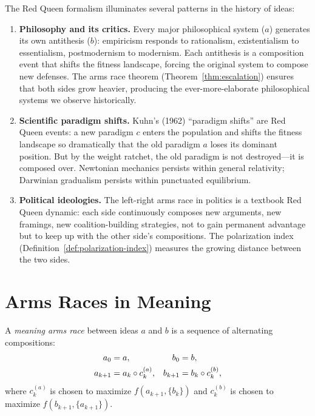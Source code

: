 \begin{interpretation}
\label{interp:coevolution-history}
The Red Queen formalism illuminates several patterns in the history of ideas:

\begin{enumerate}
  \item \textbf{Philosophy and its critics.}  Every major philosophical system
        ($a$) generates its own antithesis ($b$): empiricism responds to
        rationalism, existentialism to essentialism, postmodernism to modernism.
        Each antithesis is a composition event that shifts the fitness landscape,
        forcing the original system to compose new defenses.  The arms race
        theorem (Theorem~\ref{thm:escalation}) ensures that both sides grow
        heavier, producing the ever-more-elaborate philosophical systems we
        observe historically.

  \item \textbf{Scientific paradigm shifts.}  Kuhn's (1962) ``paradigm shifts''
        are Red Queen events: a new paradigm $c$ enters the population and
        shifts the fitness landscape so dramatically that the old paradigm $a$
        loses its dominant position.  But by the weight ratchet, the old
        paradigm is not destroyed---it is composed over.  Newtonian mechanics
        persists within general relativity; Darwinian gradualism persists
        within punctuated equilibrium.

  \item \textbf{Political ideologies.}  The left-right arms race in politics
        is a textbook Red Queen dynamic: each side continuously composes new
        arguments, new framings, new coalition-building strategies, not to
        gain permanent advantage but to keep up with the other side's
        compositions.  The polarization index
        (Definition~\ref{def:polarization-index}) measures the growing
        distance between the two sides.
\end{enumerate}
\end{interpretation}


\section{Arms Races in Meaning}

\begin{definition}
\label{def:arms-race}
A \emph{meaning arms race} between ideas $a$ and $b$ is a sequence of
alternating compositions:
\begin{align*}
  a_0 &= a, & b_0 &= b, \\
  a_{k+1} &= a_k \circ c_k^{(a)}, &
  b_{k+1} &= b_k \circ c_k^{(b)},
\end{align*}
where $c_k^{(a)}$ is chosen to maximize $f(a_{k+1}, \{b_k\})$ and
$c_k^{(b)}$ is chosen to maximize $f(b_{k+1}, \{a_{k+1}\})$.
\end{definition}


